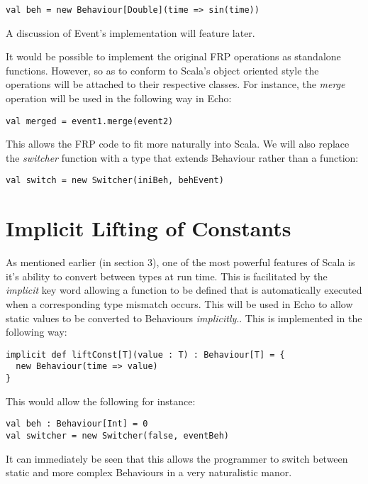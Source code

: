 \begin{verbatim}
val beh = new Behaviour[Double](time => sin(time))
\end{verbatim}  

    A discussion of Event's implementation will feature later.
    
    It would be possible to implement the original FRP operations as standalone functions. However, so
    as to conform to Scala's object oriented style the operations will be attached to their respective
    classes. For instance, the \emph{merge} operation will be used in the following way in Echo:
    
\begin{verbatim}
val merged = event1.merge(event2)
\end{verbatim}

  This allows the FRP code to fit more naturally into Scala. We will also replace the \emph{switcher} function
  with a type that extends Behaviour rather than a function:
  
\begin{verbatim}
val switch = new Switcher(iniBeh, behEvent)
\end{verbatim}

  \section{Implicit Lifting of Constants}
    As mentioned earlier (in section 3), one of the most powerful features of Scala is it's ability to convert between
    types at run time. This is facilitated by the \emph{implicit} key word allowing a function to be defined
    that is automatically executed when a corresponding type mismatch occurs. This will be used in Echo to allow 
    static values to be converted to Behaviours \emph{implicitly}.. This is implemented in the following way:  

\begin{verbatim}
implicit def liftConst[T](value : T) : Behaviour[T] = {
  new Behaviour(time => value)
}
\end{verbatim}              
    
    This would allow the following for instance:

\begin{verbatim}
val beh : Behaviour[Int] = 0
val switcher = new Switcher(false, eventBeh)
\end{verbatim}       

    It can immediately be seen that this allows the programmer to switch between static and more complex
    Behaviours in a very naturalistic manor.
    
